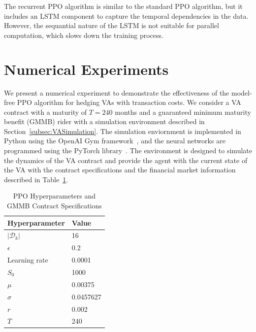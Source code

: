 The recurrent PPO algorithm is similar to the standard PPO algorithm, but it includes an LSTM component to capture the temporal dependencies in the data.
However, the sequantial nature of the LSTM is not suitable for parallel computation, which slows down the training process.




\section{Numerical Experiments}

We present a numerical experiment to demonstrate the effectiveness of the model-free PPO algorithm for hedging VAs with transaction costs.
We consider a VA contract with a maturity of $T=240$ months and a guaranteed minimum maturity benefit (GMMB) rider with a simulation environment described in Section~\ref{subsec:VASimulation}.
The simulation enviornment is implemented in Python using the OpenAI Gym framework~\citep{brockman2016openai}, and the neural networks are programmed using the PyTorch library~\citep{paszke2019pytorch}.
The environment is designed to simulate the dynamics of the VA contract and provide the agent with the current state of the VA with the contract specifications and the financial market information described in Table~\ref{tab3:hyperparameters}.

\begin{table}[ht!]
    \centering
    \begin{tabular}{ll} 
        \toprule
        Hyperparameter      & Value \\
        \midrule
        $|\mathcal{D}_k|$   & 16        \\
        $\epsilon$          & 0.2       \\
        Learning rate       & 0.0001    \\
        $S_0$               & 1000      \\
        $\mu$               & 0.00375   \\
        $\sigma$            & 0.0457627 \\
        $r$                 & 0.002     \\
        $T$                 & 240       \\
        \bottomrule
    \end{tabular}
    \caption{PPO Hyperparameters and GMMB Contract Specifications} 
    \label{tab3:hyperparameters}
\end{table}

